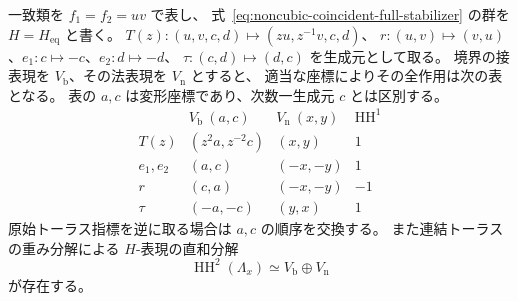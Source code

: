 \begin{proposition}[非連結成分を含む一致類の接表現]
\label{prop:noncubic-coincident-full-normal-representation}
一致類を $f_1=f_2=uv$ で表し、
式~\eqref{eq:noncubic-coincident-full-stabilizer} の群を $H=H_{\mathrm{eq}}$ と書く。
$T(z):(u,v,c,d)\mapsto(zu,z^{-1}v,c,d)$、
$r:(u,v)\mapsto(v,u)$、$e_1:c\mapsto-c$、$e_2:d\mapsto-d$、
$\tau:(c,d)\mapsto(d,c)$ を生成元として取る。
境界の接表現を $V_{\mathrm b}$、その法表現を $V_{\mathrm n}$ とすると、
適当な座標によりその全作用は次の表となる。
表の $a,c$ は変形座標であり、次数一生成元 $c$ とは区別する。
\[
\begin{array}{c|c|c|c}
 &V_{\mathrm b}\ (a,c)&V_{\mathrm n}\ (x,y)&\operatorname{HH}^1\\\hline
 T(z)&(z^2a,z^{-2}c)&(x,y)&1\\
 e_1,e_2&(a,c)&(-x,-y)&1\\
 r&(c,a)&(-x,-y)&-1\\
 \tau&(-a,-c)&(y,x)&1
\end{array}
\]
原始トーラス指標を逆に取る場合は $a,c$ の順序を交換する。
また連結トーラスの重み分解による $H$-表現の直和分解
\[
 \operatorname{HH}^2(\Lambda_x)\simeq V_{\mathrm b}\oplus V_{\mathrm n}
\]
が存在する。
\end{proposition}
